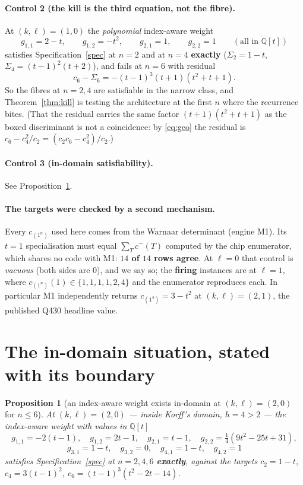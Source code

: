\documentclass[11pt]{article}
\theoremstyle{plain}
\newtheorem{proposition}[theorem]{Proposition}
\theoremstyle{definition}
\theoremstyle{remark}
\newcommand{\cm}{c^{-}}
\begin{document}
\paragraph{Control 2 (the kill is the third equation, not the fibre).} At $(k,\ell)=(1,0)$ the
\emph{polynomial} index-aware weight
\[
g_{1,1}=2-t,\qquad g_{1,2}=-t^2,\qquad g_{2,1}=1,\qquad g_{2,2}=1 \qquad(\text{all in }\mathbb{Q}[t])
\]
satisfies Specification~\ref{spec} at $n=2$ and at $n=4$ \textbf{exactly}
($\Sigma_2=1-t$, $\Sigma_4=(t-1)^2(t+2)$), and fails at $n=6$ with residual
\[
c_6-\Sigma_6=-(t-1)^3(t+1)(t^2+t+1).
\]
So the fibres at $n=2,4$ are satisfiable in the narrow class, and Theorem~\ref{thm:kill} is
testing the architecture at the first $n$ where the recurrence bites. (That the residual
carries the same factor $(t+1)(t^2+t+1)$ as the boxed discriminant is not a coincidence: by
\eqref{eq:geo} the residual is $c_6-c_4^2/c_2=(c_2c_6-c_4^2)/c_2$.)

\paragraph{Control 3 (in-domain satisfiability).} See Proposition~\ref{prop:witness}.

\paragraph{The targets were checked by a second mechanism.} Every $c_{(1^n)}$ used here comes
from the Warnaar determinant (engine M1). Its $t=1$ specialisation must equal
$\sum_T\cm(T)$ computed by the chip enumerator, which shares no code with M1: \textbf{$14$ of
$14$ rows agree}. At $\ell=0$ that control is \emph{vacuous} (both sides are $0$), and we say
so; the \textbf{firing} instances are at $\ell=1$, where $c_{(1^n)}(1)\in\{1,1,1,1,2,4\}$ and the
enumerator reproduces each. In particular M1 independently returns $c_{(1^4)}=3-t^2$ at
$(k,\ell)=(2,1)$, the published Q430 headline value.

\section{The in-domain situation, stated with its boundary}\label{sec:undecided}

\begin{proposition}[an index-aware weight exists in-domain at $(k,\ell)=(2,0)$ for $n\le6$]\label{prop:witness}
At $(k,\ell)=(2,0)$ --- inside Korff's domain, $h=4>2$ --- the index-aware weight with values in
$\mathbb{Q}[t]$
\[
g_{1,1}=-2(t-1),\quad g_{1,2}=2t-1,\quad g_{2,1}=t-1,\quad g_{2,2}=\tfrac{1}{4}(9t^2-25t+31),
\]
\[
g_{3,1}=1-t,\quad g_{3,2}=0,\quad g_{4,1}=1-t,\quad g_{4,2}=1
\]
satisfies Specification~\ref{spec} at $n=2,4,6$ \textbf{exactly}, against the targets
$c_2=1-t$, $c_4=3(t-1)^2$, $c_6=(t-1)^3(t^2-2t-14)$.
\end{proposition}
\end{document}
